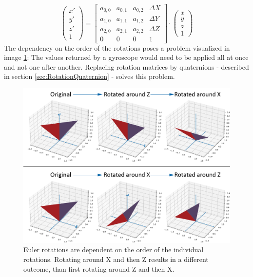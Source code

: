 \begin{equation*}
    \begin{pmatrix}
        x' \\
        y' \\
        z' \\
        1
    \end{pmatrix}
    =
    \begin{bmatrix}
        a_{0,0} & a_{0,1} & a_{0,2} & \Delta X \\
        a_{1,0} & a_{1,1} & a_{1,2} & \Delta Y \\
        a_{2,0} & a_{2,1} & a_{2,2} & \Delta Z \\
        0       & 0       & 0       & 1
    \end{bmatrix}
    \cdot
    \begin{pmatrix}
        x \\
        y \\
        z \\
        1
    \end{pmatrix}
\end{equation*}
The dependency on the order of the rotations poses a problem visualized in image \ref{im:EulerRotation}: The values returned by a gyroscope would need to be applied all at once and not one after another. Replacing rotation matrices by quaternions - described in section \ref{sec:RotationQuaternion} - solves this problem.
\begin{figure}[H]
    \centering
    \includegraphics[width=1.0\textwidth]{images/euler_rotation.png}
    \caption{Euler rotations are dependent on the order of the individual rotations. Rotating around X and then Z results in a different outcome, than first rotating around Z and then X.}
    \label{im:EulerRotation}
\end{figure}
